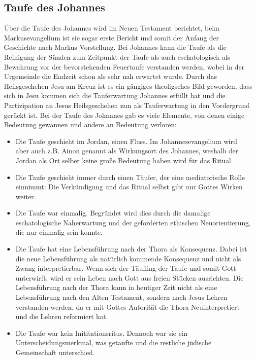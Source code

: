 \subsection{Taufe des Johannes}
Über die Taufe des Johannes wird im  Neuen Testament berichtet, beim Markusevangelium ist sie sogar erste Bericht und somit der Anfang der Geschichte nach Markus Vorstellung. Bei Johannes kann die Taufe als die Reinigung der Sünden zum Zeitpunkt der Taufe als auch eschatologisch als Bewahrung vor der bevorstehenden Feuertaufe verstanden werden, wobei in der Urgemeinde die Endzeit schon als sehr nah erwartet wurde. Durch das Heilsgeschehen Jesu am Kreuz ist es ein gängiges theoligsches Bild geworden, dass sich in Jesu kommen sich die Tauferwartung Johannes erfüllt hat und die Partizipation an Jesus Heilsgeschehen nun als Tauferwartung in den Vordergrund gerückt ist. Bei der Taufe des Johannes gab es viele Elemente, von denen einige Bedeutung gewannen und andere an Bedeutung verloren:
\begin{itemize}
	\item Die Taufe geschieht im Jordan, einen Fluss. Im Johannesevangelium wird aber auch z.B. Ainon genannt als Wirkungsort des Johannes, weshalb der Jordan als Ort selber keine große Bedeutung haben wird für das Ritual.
	\item Die Taufe geschieht immer durch einen Täufer, der eine mediatorische Rolle einnimmt: Die Verkündigung und das Ritual selbst gibt nur Gottes Wirken weiter.
	\item Die Taufe war einmalig. Begründet wird dies durch die damalige eschatologische Naherwartung und der geforderten ethischen Neuorientierung, die nur einmalig sein konnte.
	\item Die Taufe hat eine Lebensführung nach der Thora als Konsequenz. Dabei ist die neue Lebensführung als natürlich kommende Konsequenz und nicht als Zwang interpretierbar. Wenn sich der Täufling der Taufe und somit Gott unterwirft, wird er sein Leben nach Gott aus freien Stücken ausrichten. Die Lebensführung nach der Thora kann in heutiger Zeit nicht als eine Lebensführung nach den Alten Testament, sondern nach Jesus Lehren verstanden werden, da er mit Gottes Autorität die Thora Neuinterpretiert und die Lehren reformiert hat.
	\item Die Taufe war kein Inititationsritus. Dennoch war sie ein Unterscheidungsmerkmal, was getaufte und die restliche jüdische Gemeinschaft unterschied.
\end{itemize}

